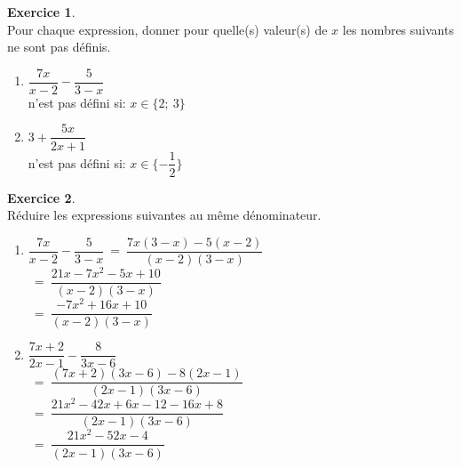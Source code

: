 \documentclass[10pt,a4paper]{article}
\theoremstyle{definition}
\theoremstyle{definition}
\newtheorem{exo}{Exercice}
\begin{document}
\begin{center}
	\begin{minipage}[c]{0.4\linewidth}
		\raggedright
		
			\begin{exo}\hfill\textbf{}\\
			Pour chaque expression, donner pour quelle(s)  valeur(s) de $x$ les nombres suivants ne sont pas définis.  
			
			\begin{enumerate}
				\item $\dfrac{7x}{x-2}-\dfrac{5}{3-x }$ \\[2mm]
				n'est pas défini si: $x\in\{2;~3\}$
				\item $ 3+\dfrac{5x}{2x+1}$\\[2mm]
				n'est pas défini si: $x\in\{-\dfrac{1}{2}\}$
			\end{enumerate}
			
		\end{exo}
		\begin{exo}\hfill\textbf{}\\
		Réduire les expressions suivantes au même dénominateur.
		
			\begin{enumerate}
				\item $\dfrac{7x}{x-2}-\dfrac{5}{3-x } \ = \    \dfrac{7x(3-x) - 5(x-2)}{(x-2)(3-x)}$\\[2mm]
				$\ = \    \dfrac{21x -7x^2-5x+10}{(x-2)(3-x)} $\\[2mm]$\ = \ \dfrac{ -7x^2+16x+10}{(x-2)(3-x)}$\\[5mm]
				\item $\dfrac{7x+2}{2x-1}- \dfrac{8}{3x-6}$\\[2mm]$ \ = \ \dfrac{(7x+2)(3x-6)-8(2x-1)}{(2x-1)(3x-6)}$\\[2mm]
				$ \ = \ \dfrac{21x^2-42x+6x-12-16x+8}{(2x-1)(3x-6)}$
				\\[2mm]
				$ \ = \ \dfrac{21x^2-52x-4}{(2x-1)(3x-6)}$
			\end{enumerate}
	\end{exo}


\end{minipage}
\end{center}
\end{document}
